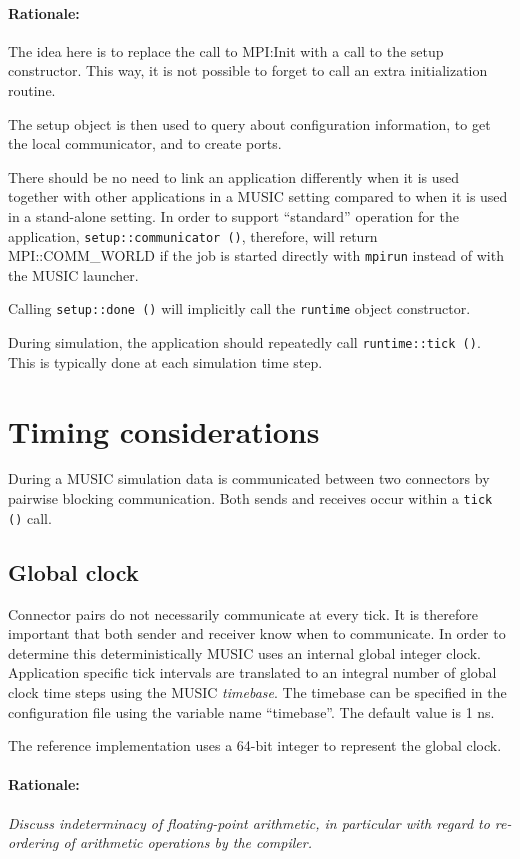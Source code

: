 \documentclass[a4paper]{report}
\newenvironment{rationale}%
{\par\paragraph{Rationale:}}%
{\par}
\begin{document}
\begin{rationale}
  The idea here is to replace the call to MPI:Init with a call to the
  setup constructor.  This way, it is not possible to forget to call
  an extra initialization routine.
\end{rationale}

The setup object is then used to query about configuration
information, to get the local communicator, and to create ports.

There should be no need to link an application differently when it is
used together with other applications in a MUSIC setting compared to
when it is used in a stand-alone setting.  In order to support
``standard'' operation for the application,
\verb|setup::communicator ()|, therefore, will return MPI::COMM\_WORLD
if the job is started directly with \verb|mpirun| instead of with the
MUSIC launcher.

Calling \verb|setup::done ()| will implicitly call the \verb|runtime|
object constructor.

During simulation, the application should repeatedly call
\verb|runtime::tick ()|.  This is typically done at each simulation
time step.

\section{Timing considerations}

During a MUSIC simulation data is communicated between two connectors
by pairwise blocking communication.  Both sends and receives occur
within a \verb|tick ()| call.

\subsection{Global clock}

Connector pairs do not necessarily communicate at every tick.  It is
therefore important that both sender and receiver know when to
communicate.  In order to determine this deterministically MUSIC uses
an internal global integer clock.  Application specific tick intervals
are translated to an integral number of global clock time steps using
the MUSIC \emph{timebase}.  The timebase can be specified in the
configuration file using the variable name ``timebase''.  The default
value is 1 ns.

The reference implementation uses a 64-bit integer to represent the
global clock.

\begin{rationale}
  \emph{Discuss indeterminacy of floating-point arithmetic, in particular
    with regard to re-ordering of arithmetic operations by the compiler.}
\end{rationale}
\end{document}
